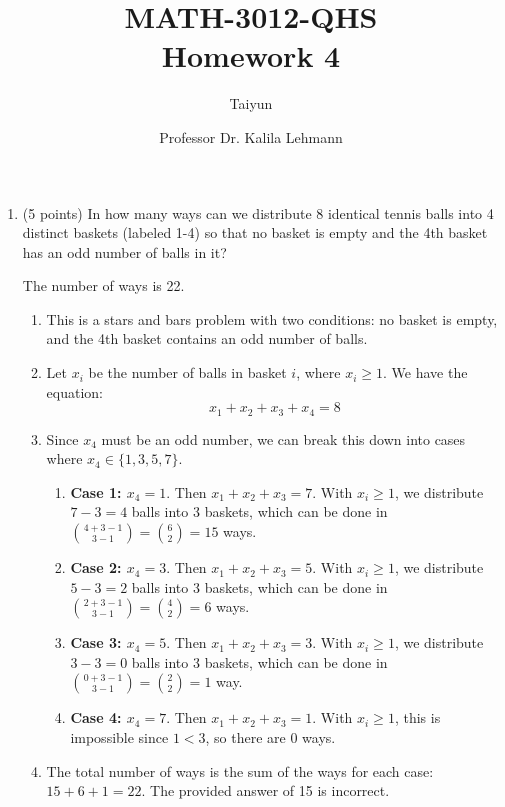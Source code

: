 \documentclass{article}
\author{Taiyun}
\title{MATH-3012-QHS \\ Homework 4}
\date{Professor Dr. Kalila Lehmann}
\begin{document}
\maketitle









\begin{enumerate}
  \item (5 points) In how many ways can we distribute 8 identical tennis balls 
  into 4 distinct baskets (labeled 1-4) so that no basket is empty and the 4th 
  basket has an odd number of balls in it?
  \begin{answer}
    The number of ways is 22.
    \begin{enumerate}
      \item This is a stars and bars problem with two conditions: no basket 
      is empty, and the 4th basket contains an odd number of balls.
      \item Let $x_i$ be the number of balls in basket $i$, where $x_i \geq 1$. 
      We have the equation:
      $$
      x_1 + x_2 + x_3 + x_4 = 8
      $$
      \item Since $x_4$ must be an odd number, we can break this down into 
      cases where $x_4 \in \{1, 3, 5, 7\}$.
      \begin{enumerate}
        \item \textbf{Case 1: $x_4 = 1$}. Then $x_1+x_2+x_3=7$. With $x_i \geq 1$, 
        we distribute $7-3=4$ balls into 3 baskets, which can be done in $\binom{4+3-1}{3-1} = \binom{6}{2} = 15$ ways.
        \item \textbf{Case 2: $x_4 = 3$}. Then $x_1+x_2+x_3=5$. With $x_i \geq 1$, 
        we distribute $5-3=2$ balls into 3 baskets, which can be done in $\binom{2+3-1}{3-1} = \binom{4}{2} = 6$ ways.
        \item \textbf{Case 3: $x_4 = 5$}. Then $x_1+x_2+x_3=3$. With $x_i \geq 1$, 
        we distribute $3-3=0$ balls into 3 baskets, which can be done in $\binom{0+3-1}{3-1} = \binom{2}{2} = 1$ way.
        \item \textbf{Case 4: $x_4 = 7$}. Then $x_1+x_2+x_3=1$. With $x_i \geq 1$, 
        this is impossible since $1 < 3$, so there are 0 ways.
      \end{enumerate}
      \item The total number of ways is the sum of the ways for 
      each case: $15 + 6 + 1 = 22$. The provided answer of 15 is incorrect.
    \end{enumerate}
  \end{answer}



\end{enumerate}
\end{document}
